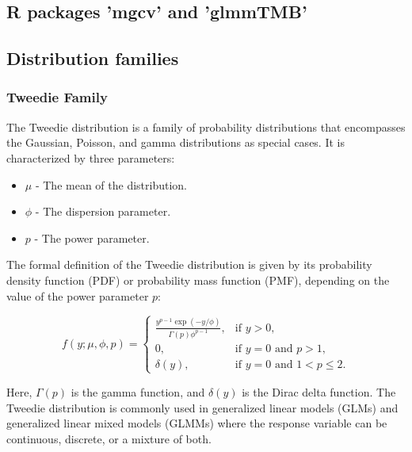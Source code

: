 
\subsection{R packages 'mgcv' and 'glmmTMB'}

\subsection{Distribution families}

\subsubsection{Tweedie Family}

The Tweedie distribution is a family of probability distributions that encompasses the Gaussian, Poisson, and gamma distributions as special cases. It is characterized by three parameters:

\begin{itemize}
    \item \( \mu \) - The mean of the distribution.
    \item \( \phi \) - The dispersion parameter.
    \item \( p \) - The power parameter.
\end{itemize}

The formal definition of the Tweedie distribution is given by its probability density function (PDF) or probability mass function (PMF), depending on the value of the power parameter \( p \):

\[
f(y; \mu, \phi, p) = 
\begin{cases} 
\frac{{y^{p-1} \exp(-y/\phi)}}{\Gamma(p)\phi^{p-1}}, & \text{if } y > 0, \\
0, & \text{if } y = 0 \text{ and } p > 1, \\
\delta(y), & \text{if } y = 0 \text{ and } 1 < p \leq 2.
\end{cases}
\]

Here, \( \Gamma(p) \) is the gamma function, and \( \delta(y) \) is the Dirac delta function. The Tweedie distribution is commonly used in generalized linear models (GLMs) and generalized linear mixed models (GLMMs) where the response variable can be continuous, discrete, or a mixture of both.


